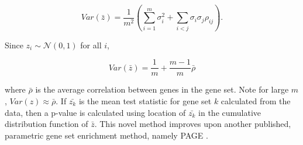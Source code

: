 \begin{equation}
Var( \bar{z} ) = \frac{1}{m^2} 
                 \left(   
                   \sum\limits_{i=1}^m \sigma{}_i^2 + 
                   \sum\limits_{i<j} \sigma{}_i \sigma{}_j \rho_{ij}
                 \right).
\end{equation}

Since $z_i \sim \mathcal{N}(0,1)$ for all $i$,

\begin{equation}
Var( \bar{z} ) = \frac{1}{m}  + \frac{m-1}{m}\bar{\rho}
\end{equation}

where $\bar{\rho}$ is the average correlation between genes in the gene set. Note for
large $m$, $Var(z) \approx \bar{\rho}$. If $\bar{z_k}$ is the 
mean test statistic for gene set $k$ calculated from the data, then a p-value
is calculated using location of $\bar{z_k}$ in the cumulative distribution 
function of $\bar{z}$. This novel method improves upon another published, parametric gene
set enrichment method, namely PAGE \cite{Kim:2005fw}.


\finishsupplement
\singlespacing
\printbibliography



